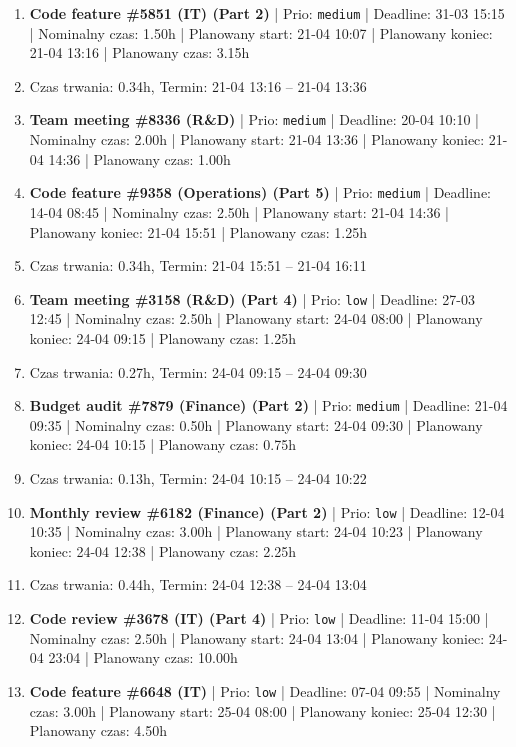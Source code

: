 {\begin{enumerate}
  \item [\textbf{14643}] \textbf{Code feature \#5851 (IT) (Part 2)} | Prio: \texttt{medium} | Deadline: 31-03 15:15 | Nominalny czas: 1.50h | Planowany start: 21-04 10:07 | Planowany koniec: 21-04 13:16 | Planowany czas: 3.15h
  \item [\textbf{PRZERWA}] Czas trwania: 0.34h, Termin: 21-04 13:16 -- 21-04 13:36
  \item [\textbf{14649}] \textbf{Team meeting \#8336 (R\&D)} | Prio: \texttt{medium} | Deadline: 20-04 10:10 | Nominalny czas: 2.00h | Planowany start: 21-04 13:36 | Planowany koniec: 21-04 14:36 | Planowany czas: 1.00h
  \item [\textbf{14661}] \textbf{Code feature \#9358 (Operations) (Part 5)} | Prio: \texttt{medium} | Deadline: 14-04 08:45 | Nominalny czas: 2.50h | Planowany start: 21-04 14:36 | Planowany koniec: 21-04 15:51 | Planowany czas: 1.25h
  \item [\textbf{PRZERWA}] Czas trwania: 0.34h, Termin: 21-04 15:51 -- 21-04 16:11
  \item [\textbf{14688}] \textbf{Team meeting \#3158 (R\&D) (Part 4)} | Prio: \texttt{low} | Deadline: 27-03 12:45 | Nominalny czas: 2.50h | Planowany start: 24-04 08:00 | Planowany koniec: 24-04 09:15 | Planowany czas: 1.25h
  \item [\textbf{PRZERWA}] Czas trwania: 0.27h, Termin: 24-04 09:15 -- 24-04 09:30
  \item [\textbf{14644}] \textbf{Budget audit \#7879 (Finance) (Part 2)} | Prio: \texttt{medium} | Deadline: 21-04 09:35 | Nominalny czas: 0.50h | Planowany start: 24-04 09:30 | Planowany koniec: 24-04 10:15 | Planowany czas: 0.75h
  \item [\textbf{PRZERWA}] Czas trwania: 0.13h, Termin: 24-04 10:15 -- 24-04 10:22
  \item [\textbf{14690}] \textbf{Monthly review \#6182 (Finance) (Part 2)} | Prio: \texttt{low} | Deadline: 12-04 10:35 | Nominalny czas: 3.00h | Planowany start: 24-04 10:23 | Planowany koniec: 24-04 12:38 | Planowany czas: 2.25h
  \item [\textbf{PRZERWA}] Czas trwania: 0.44h, Termin: 24-04 12:38 -- 24-04 13:04
  \item [\textbf{14699}] \textbf{Code review \#3678 (IT) (Part 4)} | Prio: \texttt{low} | Deadline: 11-04 15:00 | Nominalny czas: 2.50h | Planowany start: 24-04 13:04 | Planowany koniec: 24-04 23:04 | Planowany czas: 10.00h
  \item [\textbf{14683}] \textbf{Code feature \#6648 (IT)} | Prio: \texttt{low} | Deadline: 07-04 09:55 | Nominalny czas: 3.00h | Planowany start: 25-04 08:00 | Planowany koniec: 25-04 12:30 | Planowany czas: 4.50h

\end{enumerate}}

